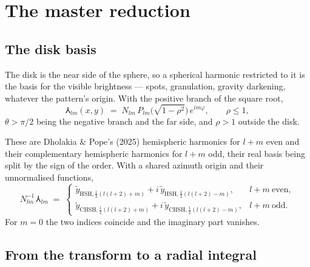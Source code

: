 
\section{The master reduction}
\label{sec:visibility}

\subsection{The disk basis}
\label{sec:disk-basis}

The disk is the near side of the sphere, so a spherical harmonic restricted to it is the basis
for the visible brightness --- spots, granulation, gravity darkening, whatever the pattern's
origin.  With the positive branch of the square root,
\begin{equation}
  \Yup_{lm}(x,y) \;=\; N_{lm}\,P_{lm}\bigl(\sqrt{1-\rho^{2}}\bigr)\,e^{im\varphi} ,
  \qquad \rho \le 1 ,
  \label{eq:disk-harmonic}
\end{equation}
$\theta > \pi/2$ being the negative branch and the far side, and $\rho > 1$ outside the disk.

These are Dholakia \& Pope's (2025) hemispheric harmonics for $l+m$ even and their complementary
hemispheric harmonics for $l+m$ odd, their real basis being split by the sign of the order.  With
a shared azimuth origin and their unnormalised functions,
\begin{equation}
  N_{lm}^{-1}\,\Yup_{lm} \;=\;
  \begin{cases}
    \tilde y_{\mathrm{HSH},{\scriptscriptstyle\frac{1}{2}}(l(l+2)+m)}
      + i\,\tilde y_{\mathrm{HSH},{\scriptscriptstyle\frac{1}{2}}(l(l+2)-m)} ,
      & l+m\ \text{even} , \\[4pt]
    \tilde y_{\mathrm{CHSH},{\scriptscriptstyle\frac{1}{2}}(l(l+2)+m)}
      + i\,\tilde y_{\mathrm{CHSH},{\scriptscriptstyle\frac{1}{2}}(l(l+2)-m)} ,
      & l+m\ \text{odd} .
  \end{cases}
  \label{eq:disk-basis-hsh}
\end{equation}
For $m = 0$ the two indices coincide and the imaginary part vanishes.

\subsection{From the transform to a radial integral}
\label{sec:separation}

